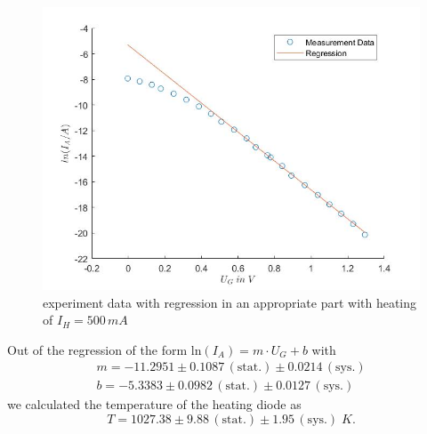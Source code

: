 \documentclass[a4paper, 12pt]{scrartcl}
\begin{document}
\begin{figure}[H]\includegraphics[scale=0.65]{500 Bild}\caption{experiment data with regression in an appropriate part with heating of $I_H=500\,mA$}\end{figure}
Out of the regression of the form $\text{ln}(I_A)=m\cdot{U_G}+b$ with
\begin{gather*}m=-11.2951\pm0.1087\,(\text{stat.})\pm0.0214\,(\text{sys.})\\
b=-5.3383\pm0.0982\,(\text{stat.})\pm0.0127\,(\text{sys.})\end{gather*}
we calculated the temperature of the heating diode as
\begin{equation*}T=1027.38\pm9.88\,(\text{stat.})\pm1.95\,(\text{sys.})\;K.\end{equation*}
\end{document}
